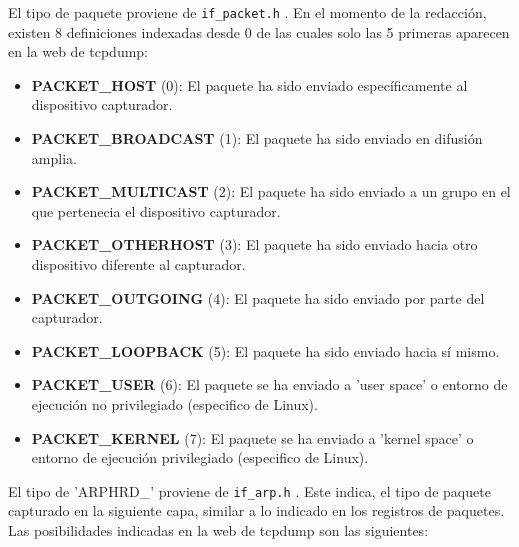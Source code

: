 El tipo de paquete proviene de \texttt{if\_packet.h} \cite{linuxifpacket}. En el momento de la redacción, existen 8 definiciones indexadas desde 0 de las cuales solo las 5 primeras aparecen en la web de tcpdump:

\begin{itemize}
    \item \textbf{PACKET\_HOST} (0): El paquete ha sido enviado específicamente al dispositivo capturador.
    \item \textbf{PACKET\_BROADCAST} (1): El paquete ha sido enviado en difusión amplia.
    \item \textbf{PACKET\_MULTICAST} (2): El paquete ha sido enviado a un grupo en el que pertenecia el dispositivo capturador.
    \item \textbf{PACKET\_OTHERHOST} (3): El paquete ha sido enviado hacia otro dispositivo diferente al capturador.
    \item \textbf{PACKET\_OUTGOING} (4): El paquete ha sido enviado por parte del capturador.
    \item \textbf{PACKET\_LOOPBACK} (5): El paquete ha sido enviado hacia sí mismo.
    \item \textbf{PACKET\_USER} (6): El paquete se ha enviado a 'user space' o entorno de ejecución no privilegiado (especifico de Linux).
    \item \textbf{PACKET\_KERNEL} (7):  El paquete se ha enviado a 'kernel space' o entorno de ejecución privilegiado (especifico de Linux).
\end{itemize}

El tipo de 'ARPHRD\_' proviene de \texttt{if\_arp.h} \cite{linuxifarp}. Este indica, el tipo de paquete capturado en la siguiente capa, similar a lo indicado en los registros de paquetes. Las posibilidades indicadas en la web de tcpdump son las siguientes:

